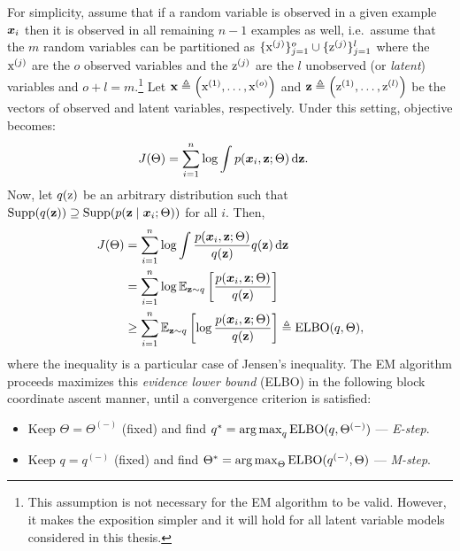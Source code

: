 For simplicity, assume that if a random variable is observed in a given example ${\bm{x}}_i$ then it is observed in all remaining $n-1$ examples as well, i.e.\ assume that the $m$ random variables can be partitioned as $\lbrace {\textnormal{x}}^{(j)} \rbrace_{j=1}^o \cup \lbrace {\textnormal{z}}^{(j)} \rbrace_{j=1}^l$ where the ${\textnormal{x}}^{(j)}$ are the $o$ observed variables and the ${\textnormal{z}}^{(j)}$ are the $l$ unobserved (or \emph{latent}) variables and $o+l=m$.\footnote{This assumption is not necessary for the EM algorithm to be valid. However, it makes the exposition simpler and it will hold for all latent variable models considered in this thesis.} Let ${\mathbf{x}} \triangleq \left({\textnormal{x}}^{(1)}, \dots, {\textnormal{x}}^{(o)} \right)$ and ${\mathbf{z}} \triangleq \left({\textnormal{z}}^{(1)}, \dots, {\textnormal{z}}^{(l)} \right)$ be the vectors of observed and latent variables, respectively. Under this setting, objective  becomes:
\begin{align}
    J(\Theta) &= \sum_{i=1}^n \log \int p({\bm{x}}_i, {\mathbf{z}}; \Theta) {\,\text{d}} {\mathbf{z}}.
\end{align}
Now, let $q({\textnormal{z}})$ be an arbitrary distribution such that $\mathrm{Supp}(q({\mathbf{z}})) \supseteq \mathrm{Supp}(p({\mathbf{z}} \mid {\bm{x}}_i; \Theta))$ for all $i$. Then,
\begingroup
\allowdisplaybreaks
\begin{align}
    J(\Theta) &= \sum_{i=1}^n \log \int \frac{p({\bm{x}}_i, {\mathbf{z}}; \Theta)}{q({\mathbf{z}})} q({\mathbf{z}}) {\,\text{d}} {\mathbf{z}} \nonumber\\
    &= \sum_{i=1}^n \log \mathbb{E}_{{\mathbf{z}} \sim q} \left[ \frac{p({\bm{x}}_i, {\mathbf{z}}; \Theta)} {q({\mathbf{z}})} \right] \nonumber\\
    &\geq \sum_{i=1}^n \mathbb{E}_{{\mathbf{z}} \sim q} \left[ \log  \frac{p({\bm{x}}_i, {\mathbf{z}}; \Theta)}{q({\mathbf{z}})} \right] \triangleq \mathrm{ELBO}(q,\Theta),
\end{align}
\endgroup
where the inequality is a particular case of Jensen's inequality. The EM algorithm proceeds maximizes this \emph{evidence lower bound} (ELBO) in the following block coordinate ascent manner, until a convergence criterion is satisfied:
\begin{itemize}
    \item Keep $\Theta = \Theta^{(-)}$ (fixed) and find $q^* = \operatorname*{arg\,max}_q \mathrm{ELBO}(q, \Theta^{(-)})$ --- \emph{E-step}.
    \item Keep $q = q^{(-)}$ (fixed) and find $\Theta^* = \operatorname*{arg\,max}_\Theta \mathrm{ELBO}(q^{(-)}, \Theta)$ --- \emph{M-step}.
\end{itemize}

